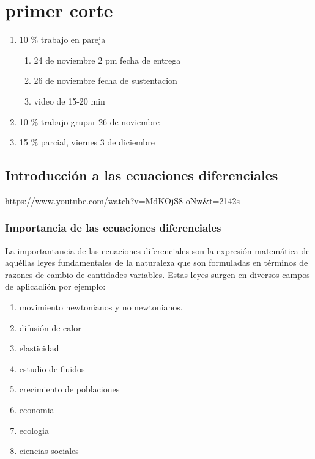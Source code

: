 \documentclass{book}
\begin{document}
    \chapter{primer corte}
    \begin{enumerate}
        \item 10 \% trabajo en pareja\begin{enumerate}
            \item 24 de noviembre 2 pm fecha de entrega
            \item 26 de noviembre fecha de sustentacion 
            \item video de 15-20 min 
        \end{enumerate}
        \item 10 \% trabajo grupar 26 de noviembre 
        \item 15 \% parcial, viernes 3 de diciembre
    \end{enumerate}
    
    \section{Introducción a las ecuaciones diferenciales}
    \url{https://www.youtube.com/watch?v=MdKOjS8-oNw&t=2142s} 

    \subsection{Importancia de las ecuaciones diferenciales}
    La importantancia de las ecuaciones diferenciales son la expresión 
    matemática de aquéllas leyes fundamentales 
    de la naturaleza que son formuladas en términos de razones de cambio
    de cantidades variables.
    Estas leyes surgen en diversos campos de aplicaclión por ejemplo:

    \begin{enumerate}
        \item movimiento newtonianos y no newtonianos.
        \item difusión de calor
        \item elasticidad
        \item estudio de fluidos
        \item crecimiento de poblaciones 
        \item economia
        \item ecologia
        \item ciencias sociales 
    \end{enumerate}
\end{document}
